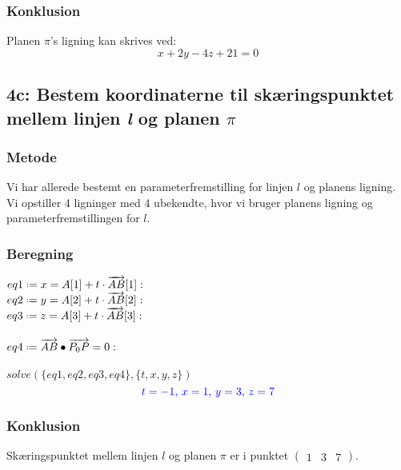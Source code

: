 \documentclass[../main.tex]{subfiles}
\begin{document}
    \subsubsection*{Konklusion}
        Planen \(\pi\)'s ligning kan skrives ved:
        \[x+2y-4z+21=0\]
\clearpage
\subsection*{4c: Bestem koordinaterne til skæringspunktet mellem linjen \textit{l} og planen \(\pi\)}
    \subsubsection*{Metode}
        Vi har allerede bestemt en parameterfremstilling for linjen \(l\) og planens ligning.\\
        Vi opstiller 4 ligninger med 4 ubekendte, hvor vi bruger planens ligning og parameterfremstillingen for \(l\).
    \subsubsection*{Beregning}
        \(eq1 \defeq x=A[1]+t\cdot \overrightarrow{AB}[1]:\)\\
        \(eq2 \defeq y=A[2]+t\cdot \overrightarrow{AB}[2]:\)\\
        \(eq3 \defeq z=A[3]+t\cdot \overrightarrow{AB}[3]:\)\\\\
        \( eq4 \defeq \overrightarrow{AB} \bullet \overrightarrow{P_0P}=0:\)\\\\
        \(solve \left(\{eq1, eq2, eq3, eq4\},\{t,x,y,z\}\right)\)
        \[\textcolor{blue}{t=-1,\, x=1,\, y=3,\, z=7}\]
    \subsubsection*{Konklusion}
    Skæringspunktet mellem linjen \(l\) og planen \(\pi\) er i punktet \(\begin{pmatrix} 1 & 3 & 7 \end{pmatrix}\).
\end{document}
